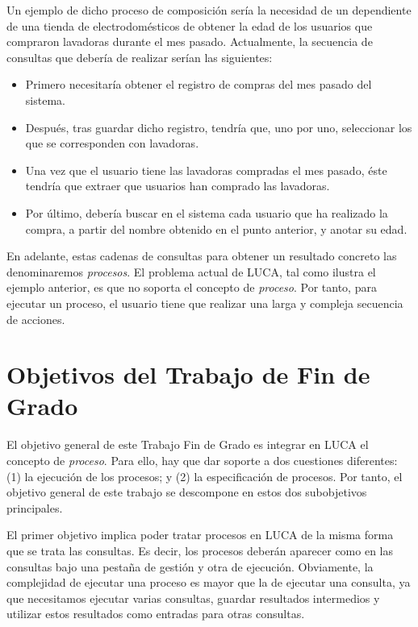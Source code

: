 Un ejemplo de dicho proceso de composición sería la necesidad de un dependiente de una tienda de electrodomésticos de obtener la edad de los usuarios que compraron lavadoras durante el mes pasado. Actualmente, la secuencia de consultas que debería de realizar serían las siguientes:

\begin{itemize}
	\item Primero necesitaría obtener el registro de compras del mes pasado del sistema.
	\item Después, tras guardar dicho registro, tendría que, uno por uno, seleccionar los que se corresponden con lavadoras.
	\item Una vez que el usuario tiene las lavadoras compradas el mes pasado, éste tendría que extraer que usuarios han comprado las lavadoras.
	\item Por último, debería buscar en el sistema cada usuario que ha realizado la compra, a partir del nombre obtenido en el punto anterior, y anotar su edad.
\end{itemize}

En adelante, estas cadenas de consultas para obtener un resultado concreto las denominaremos \emph{procesos}. El problema actual de LUCA, tal como ilustra el ejemplo anterior, es que no soporta el concepto de \emph{proceso}. Por tanto, para ejecutar un proceso,  el usuario tiene que realizar una larga y compleja secuencia de acciones.

\section{Objetivos del Trabajo de Fin de Grado}

El objetivo general de este Trabajo Fin de Grado es integrar en LUCA el concepto de \emph{proceso}. Para ello, hay que dar soporte a dos cuestiones diferentes: (1) la ejecución de los procesos; y (2) la especificación de procesos. Por tanto, el objetivo general de este trabajo se descompone en estos dos subobjetivos principales. 

El primer objetivo implica poder tratar procesos en LUCA de la misma forma que se trata las consultas. Es decir, los procesos deberán aparecer como en las consultas bajo una pestaña de gestión y otra de ejecución. Obviamente, la complejidad de ejecutar una proceso es mayor que la de ejecutar una consulta, ya que necesitamos ejecutar varias consultas, guardar resultados intermedios y utilizar estos resultados como entradas para otras consultas.


